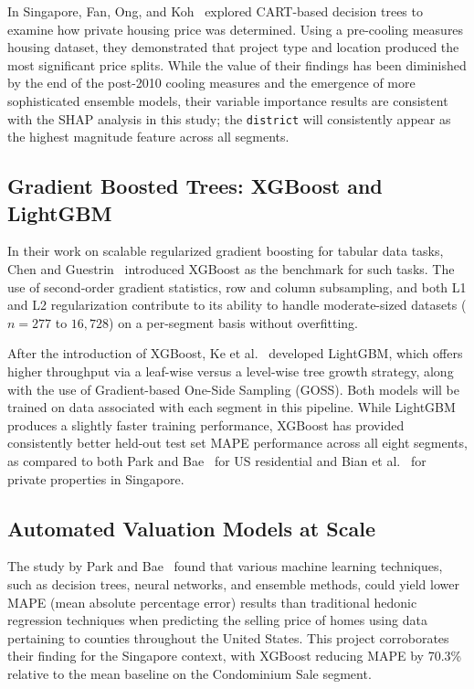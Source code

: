 In Singapore, Fan, Ong, and Koh~\cite{fan2006determinants} explored CART-based 
decision trees to examine how private housing price was determined. Using a 
pre-cooling measures housing dataset, they demonstrated that project type and 
location produced the most significant price splits. While the value of their 
findings has been diminished by the end of the post-2010 cooling measures and 
the emergence of more sophisticated ensemble models, their variable importance 
results are consistent with the SHAP analysis in this study; the 
\texttt{district} will consistently appear as the highest magnitude feature 
across all segments.

\subsection{Gradient Boosted Trees: XGBoost and LightGBM}

In their work on scalable regularized gradient boosting for tabular data tasks, 
Chen and Guestrin~\cite{chen2016xgboost} introduced XGBoost as the benchmark 
for such tasks. The use of second-order gradient statistics, row and column 
subsampling, and both L1 and L2 regularization contribute to its ability to 
handle moderate-sized datasets ($n = 277$ to $16{,}728$) on a per-segment 
basis without overfitting.

After the introduction of XGBoost, Ke et al.~\cite{ke2017lightgbm} developed 
LightGBM, which offers higher throughput via a leaf-wise versus a level-wise 
tree growth strategy, along with the use of Gradient-based One-Side Sampling 
(GOSS). Both models will be trained on data associated with each segment in 
this pipeline. While LightGBM produces a slightly faster training performance, 
XGBoost has provided consistently better held-out test set MAPE performance 
across all eight segments, as compared to both Park and Bae~\cite{park2015using} 
for US residential and Bian et al.~\cite{bian2020comparing} for private 
properties in Singapore.

\subsection{Automated Valuation Models at Scale}

The study by Park and Bae~\cite{park2015using} found that various machine 
learning techniques, such as decision trees, neural networks, and ensemble 
methods, could yield lower MAPE (mean absolute percentage error) results than 
traditional hedonic regression techniques when predicting the selling price 
of homes using data pertaining to counties throughout the United States. This project corroborates their
finding for the Singapore context, with XGBoost reducing MAPE by 70.3\% relative to the
mean baseline on the Condominium Sale segment.

